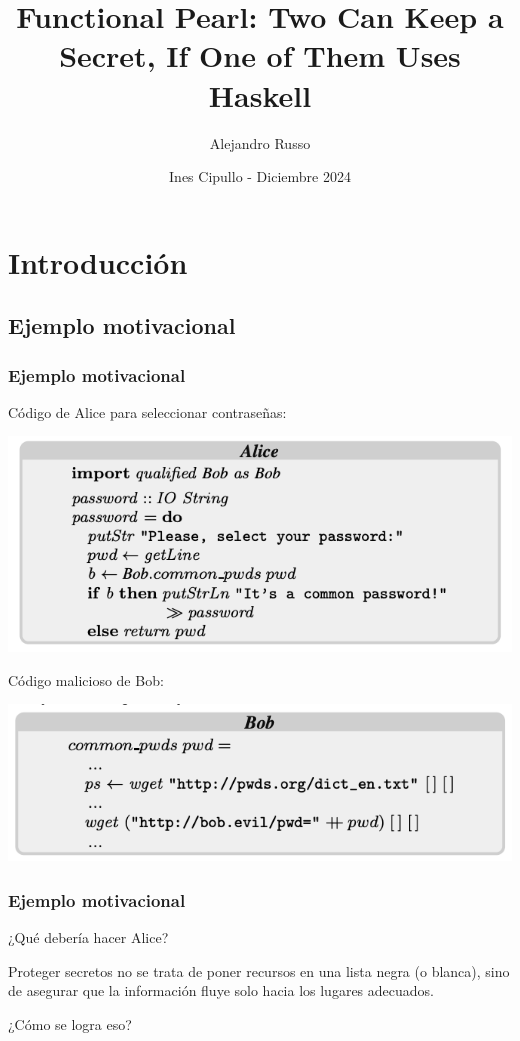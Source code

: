\documentclass{beamer}
\title[Functional Pearl - Russo] %
{Functional Pearl: \newline Two Can Keep a Secret, If One of Them Uses Haskell}
\subtitle{}
\author[Ines Cipullo] %
{Alejandro Russo}
\institute[LCC - FCEIA] %
{
  Facultad de Ciencias Exactas, Ingeniería y Agrimensura,\\
  Universidad Nacional de Rosario.
}
\date[]{Ines Cipullo - Diciembre 2024}
\begin{document}
\frame{
    \titlepage
}

\section{Introducción}
\subsection{Ejemplo motivacional}

\begin{frame}
\frametitle{Ejemplo motivacional}
    Código de Alice para seleccionar contraseñas:
    \begin{center}
        \includegraphics[scale=0.7]{codigo_alice.png}
    \end{center}

    Código malicioso de Bob:
    \begin{center}
        \includegraphics[scale=0.7]{codigo_bob.png}
    \end{center}
\end{frame}

\begin{frame}
\frametitle{Ejemplo motivacional}
    ¿Qué debería hacer Alice?
    \vspace{0.7cm}
    
    Proteger secretos no se trata de poner recursos en una lista negra (o blanca), sino de asegurar que la información fluye solo hacia los lugares adecuados.
    \vspace{0.7cm}
    
    \pause
    ¿Cómo se logra eso?
\end{frame}
\end{document}
